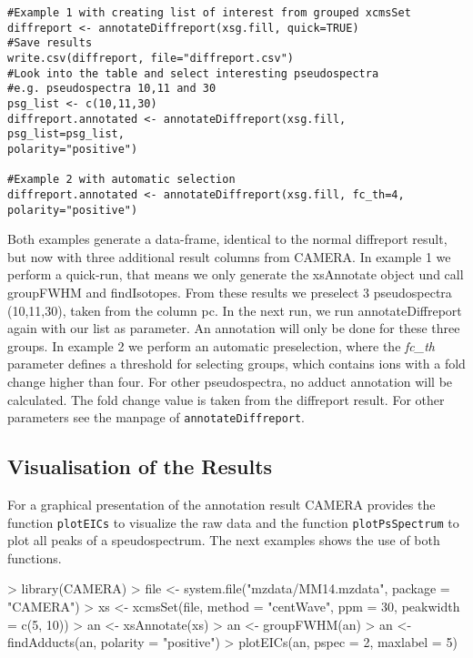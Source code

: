 \documentclass[a4paper,12pt]{article}
\newcommand{\Rfunction}[1]{{\texttt{#1}}}
\newcommand{\Rfunarg}[1]{{\textit{#1}}}
\begin{document}
\begin{verbatim}
#Example 1 with creating list of interest from grouped xcmsSet
diffreport <- annotateDiffreport(xsg.fill, quick=TRUE)
#Save results
write.csv(diffreport, file="diffreport.csv")
#Look into the table and select interesting pseudospectra
#e.g. pseudospectra 10,11 and 30
psg_list <- c(10,11,30)
diffreport.annotated <- annotateDiffreport(xsg.fill, psg_list=psg_list,
polarity="positive")

#Example 2 with automatic selection
diffreport.annotated <- annotateDiffreport(xsg.fill, fc_th=4,
polarity="positive")
\end{verbatim}

Both examples generate a data-frame, identical to the normal diffreport result,
but now with three additional result columns from CAMERA. In example 1 we
perform a quick-run, that means we only generate the xsAnnotate object und call
groupFWHM and findIsotopes. From these results we preselect 3 pseudospectra
(10,11,30), taken from the column pc. In the next run, we run annotateDiffreport
again with our list as parameter. An annotation will only be done for these
three groups.
In example 2 we perform an automatic preselection, where the \Rfunarg{fc\_th}
parameter defines a threshold for selecting groups, which contains ions with a
fold change higher than four. For other pseudospectra, no adduct annotation will
be calculated. The fold change value is taken from the diffreport result.
For other parameters see the manpage of \Rfunction{annotateDiffreport}.

\subsection{Visualisation of the Results}
For a graphical presentation of the annotation result CAMERA provides the
function \Rfunction{plotEICs} to visualize the raw data and the function
\Rfunction{plotPsSpectrum} to plot all peaks of a speudospectrum.
The next examples shows the use of both functions.
\begin{Schunk}
\begin{Sinput}
> library(CAMERA)
> file <- system.file("mzdata/MM14.mzdata", package = "CAMERA")
> xs <- xcmsSet(file, method = "centWave", ppm = 30, peakwidth = c(5, 10))
> an <- xsAnnotate(xs)
> an <- groupFWHM(an)
> an <- findAdducts(an, polarity = "positive")
> plotEICs(an, pspec = 2, maxlabel = 5)
\end{Sinput}
\end{Schunk}
\end{document}
